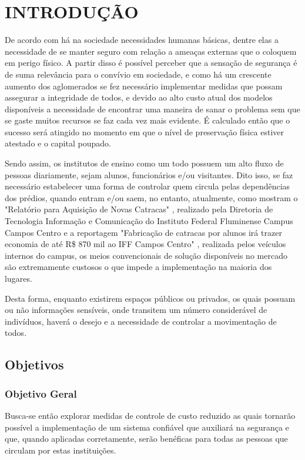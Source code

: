 \chapter{INTRODUÇÃO}
\label{cap:introducao}

De acordo com  há na sociedade necessidades humanas básicas,
dentre elas a necessidade de se manter seguro com relação a ameaças externas
que o coloquem em perigo físico. A partir disso é possível perceber que a sensação
de segurança é de suma relevância para o convívio em sociedade, e como há um crescente
aumento dos aglomerados se fez necessário implementar medidas que possam assegurar a
integridade de todos, e devido ao alto custo atual dos modelos disponíveis a necessidade
de encontrar uma maneira de sanar o problema sem que se gaste muitos recursos se faz
cada vez mais evidente. É calculado então que o sucesso será atingido no momento em que
o nível de preservação física estiver atestado e o capital poupado.



Sendo assim, os institutos de ensino como um todo possuem um alto fluxo de pessoas
diariamente, sejam alunos, funcionários e/ou visitantes. Dito isso, se faz necessário
estabelecer uma forma de controlar quem circula pelas dependências dos prédios, quando
entram e/ou saem, no entanto, atualmente, como mostram o "Relatório para Aquisição de Novas Catracas" \cite{relatorio},  realizado pela Diretoria de
Tecnologia Informação e Comunicação do Instituto Federal Fluminense Campus Campos Centro e a reportagem "Fabricação de catracas por alunos irá trazer economia de até R\$ 870 mil ao IFF Campos Centro" \cite{reportagem}, realizada pelos veículos internos do campus,  os meios convencionais de solução disponíveis
no mercado são extremamente custosos o que impede a implementação na maioria dos lugares.



Desta forma, enquanto existirem espaços públicos ou privados, os quais possuam ou não
informações sensíveis, onde transitem um número considerável de indivíduos, haverá o
desejo e a necessidade de controlar a movimentação de todos.

\section{Objetivos}
\subsection{Objetivo Geral}
Busca-se então explorar medidas de controle de custo reduzido as quais tornarão
possível a implementação de um sistema confiável que auxiliará na segurança e que,
quando aplicadas corretamente, serão benéficas para todas as pessoas que circulam
por estas instituições. 
